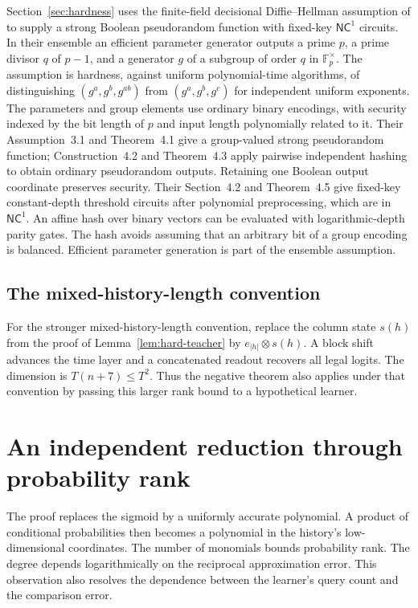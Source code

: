 \documentclass[11pt]{article}
\theoremstyle{definition}
\theoremstyle{remark}
\begin{document}
Section~\ref{sec:hardness} uses the finite-field decisional Diffie--Hellman assumption of \citet{nr} to supply a strong Boolean pseudorandom function with fixed-key $\mathsf{NC}^1$ circuits. In their ensemble an efficient parameter generator outputs a prime $p$, a prime divisor $q$ of $p-1$, and a generator $g$ of a subgroup of order $q$ in $\mathbb F_p^\times$. The assumption is hardness, against uniform polynomial-time algorithms, of distinguishing $(g^a,g^b,g^{ab})$ from $(g^a,g^b,g^c)$ for independent uniform exponents. The parameters and group elements use ordinary binary encodings, with security indexed by the bit length of $p$ and input length polynomially related to it. Their Assumption~3.1 and Theorem~4.1 give a group-valued strong pseudorandom function; Construction~4.2 and Theorem~4.3 apply pairwise independent hashing to obtain ordinary pseudorandom outputs. Retaining one Boolean output coordinate preserves security. Their Section~4.2 and Theorem~4.5 give fixed-key constant-depth threshold circuits after polynomial preprocessing, which are in $\mathsf{NC}^1$. An affine hash over binary vectors can be evaluated with logarithmic-depth parity gates. The hash avoids assuming that an arbitrary bit of a group encoding is balanced. Efficient parameter generation is part of the ensemble assumption.

\subsection{The mixed-history-length convention}\label{sec:mixed-length}

For the stronger mixed-history-length convention, replace the column state $s(h)$ from the proof of Lemma~\ref{lem:hard-teacher} by $e_{|h|}\otimes s(h)$. A block shift advances the time layer and a concatenated readout recovers all legal logits. The dimension is $T(n+7)\le T^2$. Thus the negative theorem also applies under that convention by passing this larger rank bound to a hypothetical learner.


\section{An independent reduction through probability rank}\label{sec:probability-route}

The proof replaces the sigmoid by a uniformly accurate polynomial. A product of conditional probabilities then becomes a polynomial in the history's low-dimensional coordinates. The number of monomials bounds probability rank. The degree depends logarithmically on the reciprocal approximation error. This observation also resolves the dependence between the learner's query count and the comparison error.
\end{document}
